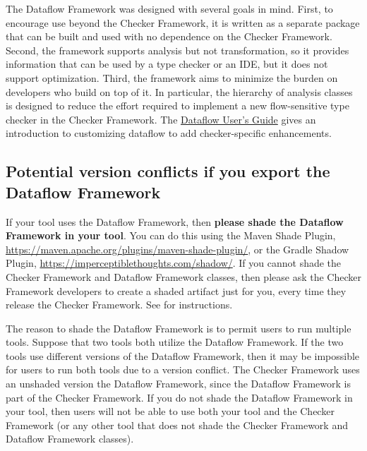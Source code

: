 The Dataflow Framework was
designed with several goals in mind.  First, to encourage use
beyond the Checker Framework, it is written as a separate package that can be
built and used with no dependence on the Checker Framework.  Second,
the framework supports analysis but not
transformation, so it provides information that can be used by a type
checker or an IDE, but it does not support optimization.  Third, the
framework aims to minimize the burden on developers who build on top
of it.  In particular, the hierarchy of analysis classes is designed
to reduce the effort required to implement a new flow-sensitive type
checker in the Checker Framework. The
\href{https://docs.google.com/document/d/1oYzbOrrS4ZEEx4wQgIHbijNzcI5CiQAq_-1NrOS8JME/edit?usp=sharing}{Dataflow User's Guide}
gives an introduction to customizing dataflow to add checker-specific
enhancements.



\subsection{Potential version conflicts if you export the Dataflow Framework}

If your tool uses the Dataflow Framework, then \textbf{please shade the
  Dataflow Framework in your tool}.  You can do this using the Maven Shade
Plugin, \url{https://maven.apache.org/plugins/maven-shade-plugin/}, or the
Gradle Shadow Plugin, \url{https://imperceptiblethoughts.com/shadow/}.
If you cannot shade the Checker Framework and Dataflow Framework classes, then
please ask the Checker Framework developers to create a shaded artifact
just for you, every time they release the Checker Framework.
See  for instructions.

The reason to shade the Dataflow Framework is to permit users to run multiple tools.
Suppose that two tools both utilize the Dataflow Framework.
If the two tools use different versions of the Dataflow Framework,
then it may be impossible for users to run both tools due to a version conflict.
The Checker Framework uses an unshaded version the Dataflow Framework,
since the Dataflow Framework is part of the Checker Framework.
If you do not shade the Dataflow Framework in your tool, then users will
not be able to use both your tool and the Checker Framework (or any other
tool that does not shade the Checker Framework and Dataflow Framework classes).


